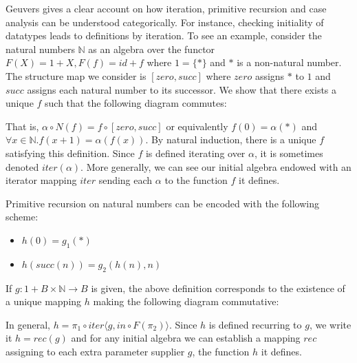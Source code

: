 \documentclass[notitlepage]{article}
\begin{document}
Geuvers \cite{geuvers2007iteration} gives a clear account on how iteration, primitive recursion and case analysis can be understood categorically. For instance, checking initiality of datatypes leads to definitions by iteration. To see an example, consider the natural numbers $\mathbb{N}$ as an algebra over the functor $F(X) = 1 + X, F(f) = id + f$ where $1 = \{*\}$ and $*$ is a non-natural number. The structure map we consider is $[zero,succ]$ where $zero$ assigns $*$ to $1$ and $succ$ assigns each natural number to its successor. We show that there exists a unique $f$ such that the following diagram commutes:
	
	
That is, $\alpha \circ N(f) = f \circ [zero,succ]$ or equivalently $f(0) = \alpha(*)$ and $\forall x \in \mathbb{N}. f(x+1) = \alpha(f(x))$. By natural induction, there is a unique $f$ satisfying this definition.	Since $f$ is defined iterating over $\alpha$, it is sometimes denoted $iter(\alpha)$. More generally, we can see our initial algebra endowed with an iterator mapping $iter$ sending each $\alpha$ to the function $f$ it defines. 

Primitive recursion on natural numbers can be encoded with the following scheme:

\begin{itemize}
\item $h(0) = g_1(*)$
\item $h(succ(n)) = g_2(h(n), n)$ 
\end{itemize}

If $g: 1 + B \times \mathbb{N} \to B$ is given, the above definition corresponds to the existence of a unique mapping $h$ making the following diagram commutative:


In general, $h = \pi_1 \circ iter\langle g, in \circ F(\pi_2)\rangle$. Since $h$ is defined recurring to $g$, we write it $h = rec(g)$ and for any initial algebra we can establish a mapping $rec$ assigning to each extra parameter supplier $g$, the function $h$ it defines.
\end{document}
